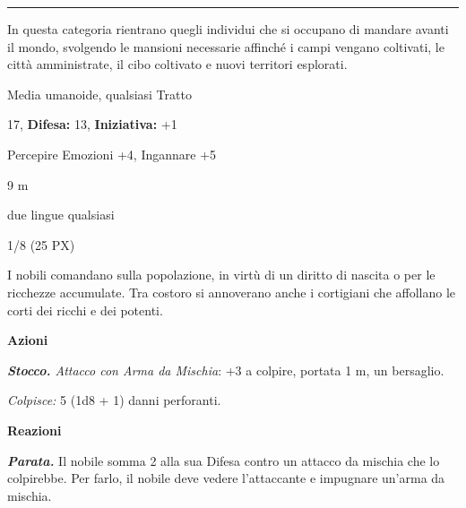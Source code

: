 \begin{multicols}{2}
{%




\noindent\rule{\linewidth}{2pt} \hypertarget{Cittadini}{}

In questa categoria rientrano quegli individui che si occupano di mandare avanti il mondo, svolgendo le mansioni necessarie affinché i campi vengano coltivati, le città amministrate, il cibo coltivato e
nuovi territori esplorati.

\begin{description}[noitemsep, topsep=0pt, parsep=0pt, partopsep=0pt, leftmargin=0cm, labelwidth=2.2cm]
    \item[\textbf{Taglia/Tipo:}] Media umanoide, qualsiasi Tratto
    \item[\textbf{Caratt.:}] 
    \item[\textbf{Punti Ferita:}] 17,  \textbf{Difesa:} 13,  \textbf{Iniziativa:} +1
    \item[\textbf{Comp.:}] Percepire Emozioni +4, Ingannare +5
    \item[\textbf{Tiri Salvez.:}] 
    \item[\textbf{Movimento:}] 9 m
    \item[\textbf{Linguaggi:}] due lingue qualsiasi
    \item[\textbf{Sfida:}] 1/8 (25 PX)\smallskip
\end{description}

I nobili comandano sulla popolazione, in virtù di un diritto di nascita o per le ricchezze accumulate. Tra costoro si annoverano anche i cortigiani che affollano le corti dei ricchi e dei potenti.

\textbf{Azioni}

\emph{\textbf{Stocco.} Attacco con Arma da Mischia}: +3 a colpire, portata 1 m, un bersaglio.

\emph{Colpisce:} 5 (1d8 + 1) danni perforanti.

\textbf{Reazioni}

\emph{\textbf{Parata.}} Il nobile somma 2 alla sua Difesa contro un attacco da mischia che lo colpirebbe. Per farlo, il nobile deve vedere l'attaccante e impugnare un'arma da mischia.

}
\end{multicols}

